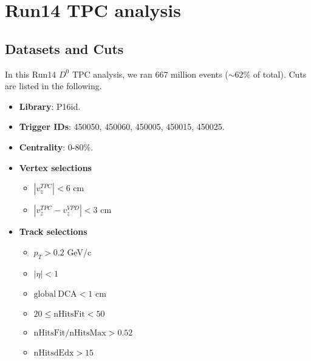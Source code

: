 \clearpage
\section{\label{Run14TPC}Run14 TPC analysis}
\subsection{Datasets and Cuts}
In this Run14 $D^0$ TPC analysis, we ran 667 million events ($\sim$62\% of total). Cuts are listed in the following.
\begin{itemize}
\item \textbf{Library}: P16id.

\item \textbf{Trigger IDs}:  450050, 450060, 450005, 450015, 450025.

\item \textbf{Centrality}: 0-80\%.

\item \textbf{Vertex selections}
\begin{itemize}
\item $|v_z^{TPC}| < 6$ cm
\item $|v_z^{TPC} - v_z^{VPD}| < 3$ cm
\end{itemize}

\item \textbf{Track selections}
\begin{itemize}
\item $p_T > 0.2$ GeV/c
\item $|\eta| < 1$
\item $\mathrm{global ~ DCA} < 1$ cm
\item $20 \leq \mathrm{nHitsFit} < 50$
\item $\mathrm{nHitsFit}/\mathrm{nHitsMax} > 0.52$
\item $\mathrm{nHitsdEdx} > 15$
\end{itemize}


\end{itemize}
